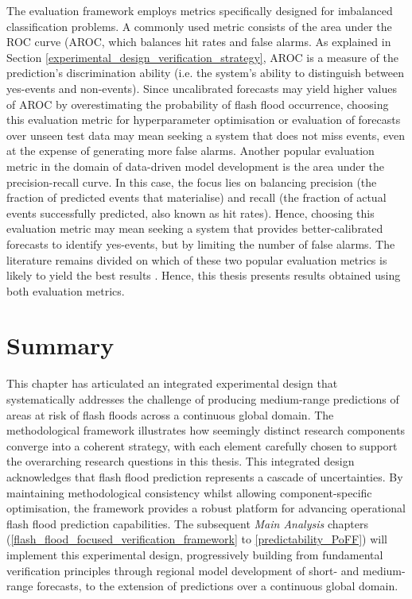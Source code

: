 The  evaluation framework employs metrics specifically designed for imbalanced classification problems. A commonly used metric consists of the area under the ROC curve (AROC, which balances hit rates and false alarms. As explained in Section \ref{experimental_design_verification_strategy}, AROC is a measure of the prediction's discrimination ability (i.e. the system's ability to distinguish between yes-events and non-events). Since uncalibrated forecasts may yield higher values of AROC by overestimating the probability of flash flood occurrence, choosing this evaluation metric for hyperparameter optimisation or evaluation of forecasts over unseen test data may mean seeking a system that does not miss events, even at the expense of generating more false alarms. Another popular evaluation metric in the domain of data-driven model development is the area under the precision-recall curve. In this case, the focus lies on balancing precision (the fraction of predicted events that materialise) and recall (the fraction of actual events successfully predicted, also known as hit rates). Hence, choosing this evaluation metric may mean seeking a system that provides better-calibrated forecasts to identify yes-events, but by limiting the number of false alarms. The literature remains divided on which of these two popular evaluation metrics is likely to yield the best results \citep{Richardson_2024, Saito_2015}. Hence, this thesis presents results obtained using both evaluation metrics.


\section{Summary}

This chapter has articulated an integrated experimental design that systematically addresses the challenge of producing medium-range predictions of areas at risk of flash floods across a continuous global domain. The methodological framework illustrates how seemingly distinct research components converge into a coherent strategy, with each element carefully chosen to support the overarching research questions in this thesis. This integrated design acknowledges that flash flood prediction represents a cascade of uncertainties. By maintaining methodological consistency whilst allowing component-specific optimisation, the framework provides a robust platform for advancing operational flash flood prediction capabilities. The subsequent \textit{Main Analysis} chapters (\ref{flash_flood_focused_verification_framework} to \ref{predictability_PoFF}) will implement this experimental design, progressively building from fundamental verification principles through regional model development of short- and medium-range forecasts, to the extension of predictions over a continuous global domain.